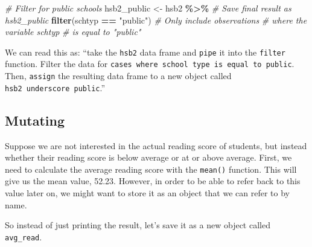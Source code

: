 \documentclass[
  10pt,
  openany]{book}
\newenvironment{Shaded}{\begin{snugshade}}{\end{snugshade}}
\newcommand{\CommentTok}[1]{\textcolor[rgb]{0.56,0.35,0.01}{\textit{#1}}}
\newcommand{\FunctionTok}[1]{\textcolor[rgb]{0.13,0.29,0.53}{\textbf{#1}}}
\newcommand{\NormalTok}[1]{#1}
\newcommand{\OtherTok}[1]{\textcolor[rgb]{0.56,0.35,0.01}{#1}}
\newcommand{\SpecialCharTok}[1]{\textcolor[rgb]{0.81,0.36,0.00}{\textbf{#1}}}
\newcommand{\StringTok}[1]{\textcolor[rgb]{0.31,0.60,0.02}{#1}}
\theoremstyle{definition}
\theoremstyle{definition}
\theoremstyle{definition}
\theoremstyle{definition}
\theoremstyle{remark}
\begin{document}
\begin{Shaded}
\begin{Highlighting}[]
\CommentTok{\# Filter for public schools}
\NormalTok{hsb2\_public }\OtherTok{\textless{}{-}}\NormalTok{ hsb2 }\SpecialCharTok{\%\textgreater{}\%}  \CommentTok{\# Save final result as hsb2\_public}
  \FunctionTok{filter}\NormalTok{(schtyp }\SpecialCharTok{==} \StringTok{"public"}\NormalTok{)  }\CommentTok{\# Only include observations}
                              \CommentTok{\# where the variable schtyp}
                              \CommentTok{\# is equal to "public"}
\end{Highlighting}
\end{Shaded}

We can read this as: ``take the \texttt{hsb2} data frame and \texttt{pipe} it
into the \texttt{filter} function. Filter the data for
\texttt{cases\ where\ school\ type\ is\ equal\ to\ public}. Then,
\texttt{assign} the resulting data frame to a new object
called \texttt{hsb2\ underscore\ public}.''

\subsection*{Mutating}\label{mutating}

Suppose we are not interested in the actual reading score
of students, but instead whether their reading score is below
average or at or above average.
First, we need to calculate the average reading score with
the \texttt{mean()} function.
This will give us the mean value, 52.23.
However, in order to be able to refer back to this value later on,
we might want to store it as an object that we can refer to by name.

\begin{Shaded}
\end{Shaded}

So instead of just printing the result, let's save it as
a new object called \texttt{avg\_read}.

\begin{Shaded}
\end{Shaded}
\end{document}
